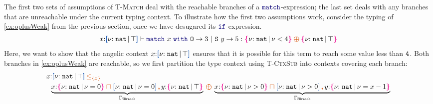 \begin{example} The first two sets of assumptions of
  \textsc{T-Match} deal with the reachable branches of a
  $\mykw{match}$-expression; the last set deals with any branches that
  are unreachable under the current typing context. To illustrate how
  the first two assumptions work, consider the typing of
  \ref{ex:oplusWeak} from the previous section, once we have desugared
  its $\mykw{if}$ expression.
\vspace{-0.2em}
\begin{align*}
  x{:}\urt{\Nat}{\top} \vdash \zmatchNat{x}{3}{y}{5} : \ort{\Nat}{\vnu < 4} \ctoplus \ort{\Nat}{\top}
\end{align*}
Here, we want to show that the angelic context $x{:}\urt{\Nat}{\top}$
ensures that it is possible for this term to reach some value less
than ${\tt 4}$. Both branches in \ref{ex:oplusWeak} are reachable, so
we first partition the type context using \textsc{T-CtxSub} into
contexts covering each branch: %
{\small %
  \vspace{-0.2em}
  \begin{align*}
    &x{:}\urt{\Nat}{\top} \ctsubseteq{\{x\}} \\
    & \;\;
      \underbrace{x{:}\ort{\Nat}{\vnu = 0}\interty \urt{\Nat}{\vnu =
      0} \ctcomma
      y{:}\ort{\Nat}{\top} }_{\Gamma_{\Code{TBranch}}} \ctoplus
      \underbrace{x{:}\ort{\Nat}{\vnu > 0}\interty
      \urt{\Nat}{\vnu > 0} \ctcomma
      y{:}\ort{\Nat}{\vnu = x - 1} }_{\Gamma_{\Code{FBranch}}}
  \end{align*}}\noindent
{}


\end{example}
